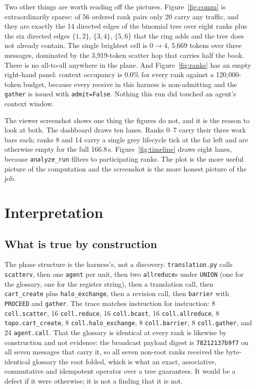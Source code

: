 \documentclass[11pt]{article}
\begin{document}
Two other things are worth reading off the pictures. Figure~\ref{fig:comm} is
extraordinarily sparse: of 56 ordered rank pairs only 20 carry any traffic, and they are
exactly the 14 directed edges of the binomial tree over eight ranks plus the six directed
edges $\{1,2\}$, $\{3,4\}$, $\{5,6\}$ that the ring adds and the tree does not already
contain. The single brightest cell is $0\to4$, 5{,}669 tokens over three messages,
dominated by the 3{,}919-token scatter hop that carries half the book. There is no
all-to-all anywhere in the plane. And
Figure~\ref{fig:ranks} has an empty right-hand panel: context occupancy is 0.0\% for
every rank against a 120{,}000-token budget, because every receive in this harness is
non-admitting and the \texttt{gather} is issued with \texttt{admit=False}. Nothing this
run did touched an agent's context window.

The viewer screenshot shows one thing the figures do not, and it is the reason to look at
both. The dashboard draws ten lanes. Ranks 0--7 carry their three work bars each; ranks 8
and 14 carry a single grey lifecycle tick at the far left and are otherwise empty for the
full 166.8\,s. Figure~\ref{fig:timeline} draws eight lanes, because \texttt{analyze\_run}
filters to participating ranks. The plot is the more useful picture of the computation and
the screenshot is the more honest picture of the job.

\section{Interpretation}

\subsection*{What is true by construction}

The phase structure is the harness's, not a discovery. \texttt{translation.py} calls
\texttt{scatterv}, then one \texttt{agent} per unit, then two \texttt{allreduce}s under
\texttt{UNION} (one for the glossary, one for the register string), then a translation
call, then \texttt{cart\_create} plus \texttt{halo\_exchange}, then a revision call, then
\texttt{barrier} with \texttt{PROCEED} and \texttt{gather}. The trace matches instruction
for instruction: 8 \texttt{coll.scatter}, 16 \texttt{coll.reduce}, 16 \texttt{coll.bcast},
16 \texttt{coll.allreduce}, 8 \texttt{topo.cart\_create}, 8 \texttt{coll.halo\_exchange},
8 \texttt{coll.barrier}, 8 \texttt{coll.gather}, and 24 \texttt{agent.call}. That the
glossary is identical at every rank is likewise by construction and not evidence: the
broadcast payload digest is \texttt{78212137b9f7} on all seven messages that carry it, so
all seven non-root ranks received the byte-identical glossary the root folded, which is
what an exact, associative, commutative and idempotent operator over a tree guarantees. It would
be a defect if it were otherwise; it is not a finding that it is not.
\end{document}
